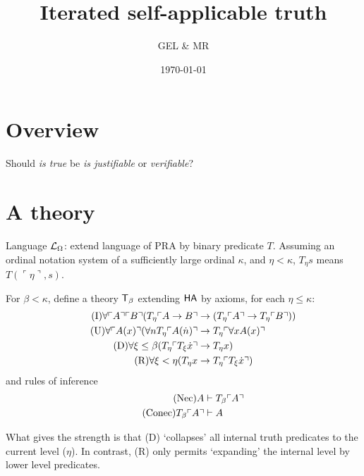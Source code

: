 \documentclass[UKenglish,cleveref,DIV=12]{scrartcl}
\title{Iterated self-applicable truth}
\author{GEL \& MR}
\date{\today}
\theoremstyle{definition}
\theoremstyle{definition}
\begin{document}
\maketitle

\tableofcontents



\section{Overview}
Should \emph{is true} be \emph{is justifiable} or \emph{verifiable}?

\section{A theory}

Language \( \mathcal{L}_\Omega \): extend language of PRA by binary predicate \( T \).
Assuming an ordinal notation system of a sufficiently large ordinal \( \kappa \), and \( \eta < \kappa \), \( T_\eta s \) means \( T( \ulcorner \eta \urcorner , s ) \).

For \( \beta < \kappa \), define a theory \( \mathsf{T}_\beta \) extending \( \mathsf{HA} \) by axioms, for each \( \eta \le \kappa \):
\begin{align*}
\tag{I}
	\forall \ulcorner{A}\urcorner \ulcorner{B}\urcorner ( T_\eta \ulcorner{ A \rightarrow B}\urcorner &\rightarrow ( T_\eta \ulcorner{A}\urcorner \rightarrow T_\eta \ulcorner{B}\urcorner ) )
	\\
\tag{U}
	\forall \ulcorner{A(x)}\urcorner( \forall n T_\eta  \ulcorner{ A(\dot n)}\urcorner &\rightarrow T_\eta \ulcorner{ \forall x A(x) }\urcorner
	\\
\tag{D}
	\forall \xi \le \beta ( T_\eta \ulcorner{ T_\xi \dot x }\urcorner &\rightarrow T_\eta x )
	\\
\tag{R}
	\forall \xi < \eta ( T_\eta x &\rightarrow T_\eta \ulcorner{ T_\xi \dot x }\urcorner)
\end{align*}
%
and rules of inference
\begin{align*}
	\tag{Nec}
	A &\vdash T_\beta \ulcorner{A}\urcorner
	\\
	\tag{Conec}
	T_\beta \ulcorner{A}\urcorner &\vdash A
\end{align*}

What gives the strength is that (D) `collapses' all internal truth predicates to the current level (\( \eta \)).
In contrast, (R) only permits `expanding' the internal level by lower level predicates.
\end{document}
